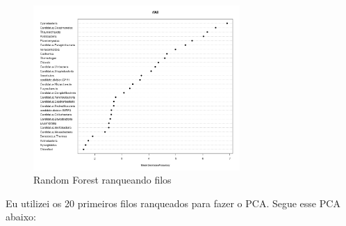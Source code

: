 \documentclass[12pt, a4paper]{report}
\begin{document}
\begin{figure}[!h]
  \centering 
  \includegraphics[width=0.7\textwidth]{figures/randomforest_taxonomic_corais_2018_10_01.jpeg}
  \caption{Random Forest ranqueando filos}
  \end{figure}

Eu utilizei os 20 primeiros filos ranqueados para fazer o PCA. Segue esse PCA abaixo:
\end{document}
